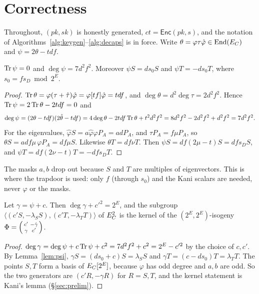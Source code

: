 \section{Correctness}\label{sec:correctness}

Throughout, $(\mathit{pk},\mathit{sk})$ is honestly generated,
$\mathit{ct}=\textsf{Enc}(\mathit{pk},s)$, and the notation of
Algorithms~\ref{alg:keygen}--\ref{alg:decaps} is in force. Write
$\theta=\varphi\tau\hat\varphi\in\operatorname{End}(E_C)$ and $\psi=2\theta-tdf$.

\begin{lemma}\label{lem:psi}
$\operatorname{Tr}\psi=0$ and $\deg\psi=7d^2f^2$. Moreover $\psi S=ds_0S$ and
$\psi T=-ds_0T$, where $s_0=fs_D\bmod 2^E$.
\end{lemma}

\begin{proof}
$\operatorname{Tr}\theta=\varphi(\tau+\hat\tau)\hat\varphi=\varphi[tf]\hat\varphi=tdf$, and
$\deg\theta=d^2\deg\tau=2d^2f^2$. Hence $\operatorname{Tr}\psi=2\operatorname{Tr}\theta-2tdf=0$ and
\[
\deg\psi=(2\theta-tdf)(2\hat\theta-tdf)=4\deg\theta-2tdf\operatorname{Tr}\theta+t^2d^2f^2=8d^2f^2-2d^2f^2+d^2f^2=7d^2f^2 .
\]
For the eigenvalues, $\hat\varphi S=a\hat\varphi\varphi P_A=adP_A$, and
$\tau P_A=f\mu P_A$, so $\theta S=adf\mu\,\varphi P_A=df\mu S$. Likewise
$\theta T=df\nu T$. Then $\psi S=df(2\mu-t)S=dfs_DS$, and
$\psi T=df(2\nu-t)T=-dfs_DT$.
\end{proof}

The masks $a,b$ drop out because $S$ and $T$ are multiples of eigenvectors.
This is where the trapdoor is used: only $f$ (through $s_0$) and the Kani
scalars are needed, never $\varphi$ or the masks.

\begin{proposition}\label{prop:kani}
Let $\gamma=\psi+c$. Then $\deg\gamma+c'^2=2^E$, and the subgroup
$\langle(c'S,-\lambda_SS),(c'T,-\lambda_TT)\rangle$ of $E_C^2$ is the kernel of
the $(2^E,2^E)$-isogeny $\Phi=\begin{psmallmatrix}c'&-\hat\gamma\\ \gamma&c'\end{psmallmatrix}$.
\end{proposition}

\begin{proof}
$\deg\gamma=\deg\psi+c\operatorname{Tr}\psi+c^2=7d^2f^2+c^2=2^E-c'^2$ by the choice of
$c,c'$. By Lemma~\ref{lem:psi}, $\gamma S=(ds_0+c)S=\lambda_SS$ and
$\gamma T=(c-ds_0)T=\lambda_TT$. The points $S,T$ form a basis of $E_C[2^E]$,
because $\varphi$ has odd degree and $a,b$ are odd. So the two generators
are $(c'R,-\gamma R)$ for $R=S,T$, and the kernel statement is Kani's lemma
(\S\ref{sec:prelim}).
\end{proof}

